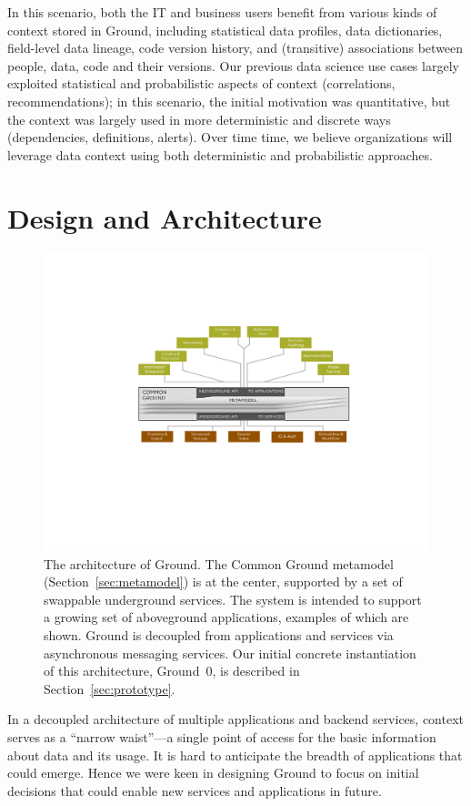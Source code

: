 \documentclass{cidr-2017}
\begin{document}
In this scenario, both the IT and business users benefit from various kinds of context stored in Ground, including statistical data profiles, data dictionaries, field-level data lineage, code version history, and (transitive) associations between people, data, code and their versions. Our previous data science use cases largely exploited statistical and probabilistic aspects of context (correlations, recommendations); in this scenario, the initial motivation was quantitative, but the context was largely used in more deterministic and discrete ways (dependencies, definitions, alerts). Over time time, we believe organizations will leverage data context using both deterministic and probabilistic approaches.

\section{Design and Architecture}
\label{sec:arch}
\begin{figure}[th]
\centering
\includegraphics[width=0.6\linewidth]{architecture-tree.pdf}
  \caption{The architecture of Ground. The Common Ground metamodel (Section~\ref{sec:metamodel}) is at the center, supported by a set of swappable underground services. The system is intended to support a growing set of aboveground applications, examples of which are shown. Ground is decoupled from applications and services via asynchronous messaging services. Our initial concrete instantiation of this architecture, Ground~0, is described in Section~\ref{sec:prototype}.}
\label{fig:arch}
\end{figure}

In a decoupled architecture of multiple applications and backend services, context serves as a ``narrow waist''---a single point of access for the basic information about data and its usage. It is hard to anticipate the breadth of applications that could emerge.
Hence we were keen in designing Ground to focus on initial decisions that could enable new services and applications in future. 
\end{document}

